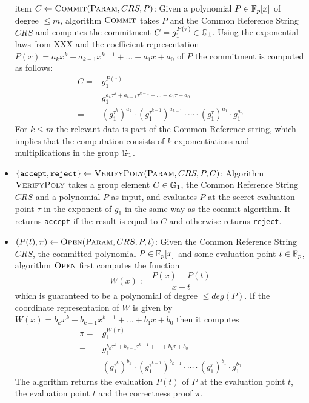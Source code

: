 \begin{itemize}
item $C\leftarrow \textsc{Commit}(\textsc{Param}, CRS,P)$: Given a polynomial $P\in \mathbb{F}_p[x]$ of degree $\leq m$, algorithm $\textsc{Commit}$ takes $P$ and the Common Reference String $CRS$ and computes the commitment $C = g_1^{P(\tau)} \in \mathbb{G}_1$. Using the exponential laws from XXX and the coefficient representation $P(x) = a_k x^k + a_{k-1}x^{k-1}+ \ldots + a_1 x + a_0$ of $P$ the commitment is computed as follows:
\begin{equation}
\begin{array}{rl}
C = & g_1^{P(\tau)} \\
  = & g_1^{a_k \tau^k + a_{k-1}\tau^{k-1}+ \ldots + a_1 \tau + a_0} \\
  = & \left(g_1^{\tau^k}\right)^{a_k} \cdot \left(g_1^{\tau^{k-1}}\right)^{a_{k-1}}\cdot \cdots \cdot 
      \left(g_1^\tau\right)^{a_1}\cdot g_1^{a_0}
\end{array}
\end{equation} 
For $k\leq m$ the relevant data is part of the Common Reference string, which implies that the computation consists of $k$ exponentiations and multiplications in the group $\mathbb{G}_1$.

\item $\{\mathtt{accept},\mathtt{reject}\}\leftarrow \textsc{VerifyPoly}(\textsc{Param}, CRS,P,C)$: Algorithm $\textsc{VerifyPoly}$ takes a group element $C\in \mathbb{G}_1$, the Common Reference String $CRS$ and a polynomial $P$ as input, and evaluates $P$ at the secret evaluation point $\tau$ in the exponent of $g_1$ in the same way as the commit algorithm. It returns \texttt{accept} if the result is equal to $C$ and otherwise returns \texttt{reject}.

\item $(P(t),\pi)\leftarrow \textsc{Open}(\textsc{Param}, CRS,P,t)$: Given the Common Reference String $CRS$, the committed polynomial $P\in \mathbb{F}_p[x]$ and some evaluation point $t\in \mathbb{F}_p$, algorithm $\textsc{Open}$
first computes the function
\begin{equation}
W(x) := \frac{P(x) - P(t)}{x-t}
\end{equation}
which is guaranteed to be a polynomial of degree $\leq deg(P)$. If the coordinate representation of $W$ is given by $W(x) = b_k x^k + b_{k-1}x^{k-1}+ \ldots + b_1 x + b_0$ then it computes  
\begin{equation}
\begin{array}{rl}
\pi = & g_1^{W(\tau)} \\
  = & g_1^{b_k \tau^k + b_{k-1}\tau^{k-1}+ \ldots + b_1 \tau + b_0} \\
  = & \left(g_1^{\tau^k}\right)^{b_k} \cdot \left(g_1^{\tau^{k-1}}\right)^{b_{k-1}}\cdot \cdots \cdot 
      \left(g_1^\tau\right)^{b_1}\cdot g_1^{b_0}
\end{array}
\end{equation}
The algorithm returns the evaluation $P(t)$ of $P$ at the evaluation point $t$, the evaluation point $t$ and the correctness proof $\pi$.


\end{itemize}
